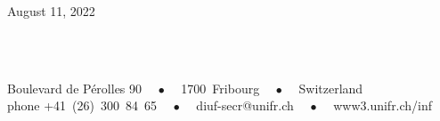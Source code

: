 \begin{titlepage}
\begin{center}
August 11, 2022 %
\vspace*{.06\textheight}

\groupname\\\deptname\\ %
\vfill

\footnotesize{ Boulevard de Pérolles 90 ~~$\bullet$~~ 1700~Fribourg ~~$\bullet$~~ Switzerland
            \\
            phone +41~(26)~300~84~65 ~~$\bullet$~~ \textsf{diuf-secr@unifr.ch} ~~$\bullet$~~ \textsf{www3.unifr.ch/inf}
            }


\end{center}
\end{titlepage}
